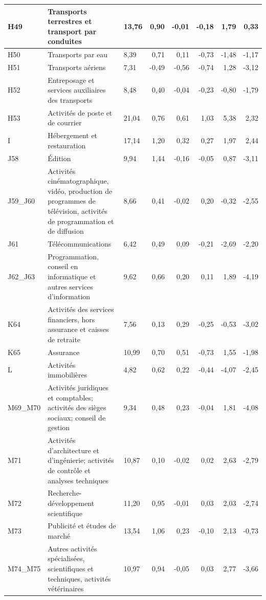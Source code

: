 \begin{small}
\begin{longtable}{m{1.3cm}m{5.7cm}m{1cm}rrrrr}
	\hline
	H49 & Transports terrestres et transport par conduites & 13,76 & 0,90 & -0,01 & -0,18 & 1,79 & 0,33 \\ 
	\hline
	H50 & Transports par eau & 8,39 & 0,71 & 0,11 & -0,73 & -1,48 & -1,17 \\ 
	\hline
	H51 & Transports aériens & 7,31 & -0,49 & -0,56 & -0,74 & 1,28 & -3,12 \\ 
	\hline
	H52 & Entreposage et services auxiliaires des transports & 8,48 & 0,40 & -0,04 & -0,23 & -0,80 & -1,79 \\ 
	\hline
	H53 & Activités de poste et de courrier & 21,04 & 0,76 & 0,61 & 1,03 & 5,38 & 2,32 \\ 
	\hline
	I & Hébergement et restauration & 17,14 & 1,20 & 0,32 & 0,27 & 1,97 & 2,44 \\ 
	\hline
	J58 & Édition & 9,94 & 1,44 & -0,16 & -0,05 & 0,87 & -3,11 \\ 
	\hline
	J59\_J60 & Activités cinématographique, vidéo, production de programmes de télévision, activités de programmation et de diffusion & 8,66 & 0,41 & -0,02 & 0,20 & -0,32 & -2,55 \\ 
	\hline
	J61 & Télécommunications & 6,42 & 0,49 & 0,09 & -0,21 & -2,69 & -2,20 \\ 
	\hline
	J62\_J63 & Programmation, conseil en informatique et autres services d'information & 9,62 & 0,66 & 0,20 & 0,11 & 1,89 & -4,19 \\ 
	\hline
	K64 & Activités des services financiers, hors assurance et caisses de retraite & 7,56 & 0,13 & 0,29 & -0,25 & -0,53 & -3,02 \\ 
	\hline
	K65 & Assurance & 10,99 & 0,70 & 0,51 & -0,73 & 1,55 & -1,98 \\ 
	\hline
	L & Activités immobilières & 4,82 & 0,62 & 0,22 & -0,44 & -4,07 & -2,45 \\ 
	\hline
	M69\_M70 & Activités juridiques et comptables; activités des sièges sociaux; conseil de gestion & 9,34 & 0,48 & 0,23 & -0,04 & 1,81 & -4,08 \\ 
	\hline
	M71 & Activités d'architecture et d'ingénierie; activités de contrôle et analyses techniques & 10,87 & 0,10 & -0,02 & 0,02 & 2,63 & -2,79 \\ 
	\hline
	M72 & Recherche-développement scientifique & 11,20 & 0,95 & -0,01 & 0,03 & 2,03 & -2,74 \\ 
	\hline
	M73 & Publicité et études de marché & 13,54 & 1,06 & 0,23 & -0,10 & 2,13 & -0,73 \\ 
	\hline
	M74\_M75 & Autres activités spécialisées, scientifiques et techniques, activités vétérinaires & 10,97 & 0,94 & -0,05 & 0,03 & 2,77 & -3,66 \\ 

\end{longtable}
\end{small}
